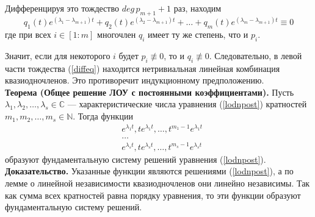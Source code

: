 Дифференцируя это тождество $deg\, p_{m+1} + 1$ раз, находим
\begin{equation}
    q_1(t)e^{(\lambda_1 - \lambda_{m+1}) t} + q_2(t)e^{(\lambda_2 - \lambda_{m+1}) t} + \ldots + q_m(t)e^{(\lambda_m - \lambda_{m+1}) t} \equiv 0 \label{diffeq}
\end{equation}
где при всех $i \in [1:m]$ многочлен $q_i$ имеет ту же степень, что и $p_i$.

Значит, если для некоторого $i$ будет $p_i \not\equiv 0$, то и $q_i \not\equiv 0$. Следовательно, в левой части тождества (\ref{diffeq}) находится нетривиальная линейная комбинация квазиодночленов. Это противоречит индукционному предположению.\\

\noindent \textbf{Теорема (Общее решение ЛОУ с постоянными коэффициентами).} Пусть $\lambda_1, \lambda_2, \ldots, \lambda_s \in \mathbb{C}$ --- характеристические числа уравнения (\ref{lodnpost}) кратностей $m_1, m_2, \ldots, m_s \in \mathbb{N}$. Тогда функции
\begin{equation}
    \begin{aligned}
        &e^{\lambda_1 t}, te^{\lambda_1 t}, \ldots, t^{m_1 - 1}e^{\lambda_1 t}\\
        &\ldots\\
        &e^{\lambda_s t}, te^{\lambda_s t}, \ldots, t^{m_s - 1}e^{\lambda_s t}
    \end{aligned} \label{fundsyst}
\end{equation}
образуют фундаментальную систему решений уравнения (\ref{lodnpost}).\\

\noindent \textbf{Доказательство.} Указанные функции являются решениями (\ref{lodnpost}), а по лемме о линейной независимости квазиодночленов они линейно независимы. Так как сумма всех кратностей равна порядку уравнения, то эти функции образуют фундаментальную систему решений.